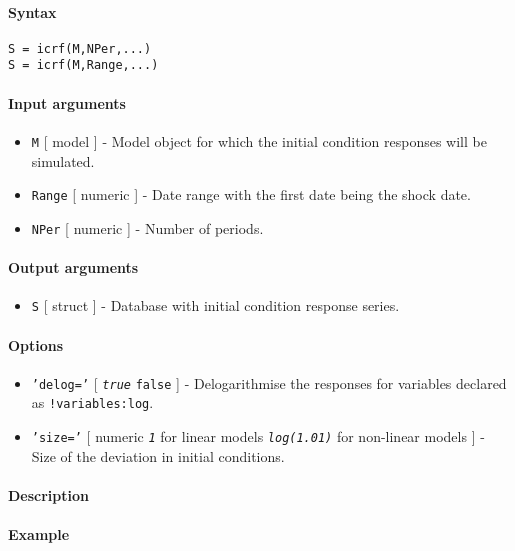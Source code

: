 


	\paragraph{Syntax}

\begin{verbatim}
S = icrf(M,NPer,...)
S = icrf(M,Range,...)
\end{verbatim}

\paragraph{Input arguments}

\begin{itemize}
\item
  \texttt{M} {[} model {]} - Model object for which the initial
  condition responses will be simulated.
\item
  \texttt{Range} {[} numeric {]} - Date range with the first date being
  the shock date.
\item
  \texttt{NPer} {[} numeric {]} - Number of periods.
\end{itemize}

\paragraph{Output arguments}

\begin{itemize}
\itemsep1pt\parskip0pt
\item
  \texttt{S} {[} struct {]} - Database with initial condition response
  series.
\end{itemize}

\paragraph{Options}

\begin{itemize}
\item
  \texttt{'delog='} {[} \emph{\texttt{true}} \textbar{} \texttt{false}
  {]} - Delogarithmise the responses for variables declared as
  \texttt{!variables:log}.
\item
  \texttt{'size='} {[} numeric \textbar{} \emph{\texttt{1}} for linear
  models \textbar{} \emph{\texttt{log(1.01)}} for non-linear models {]}
  - Size of the deviation in initial conditions.
\end{itemize}

\paragraph{Description}

\paragraph{Example}


